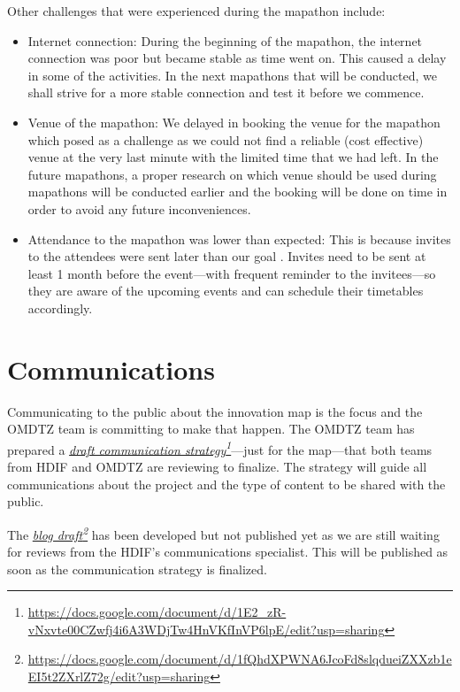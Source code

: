 \documentclass[a4paper,12pt,twoside]{article}
\begin{document}
Other challenges that were experienced during the mapathon include:
\begin{itemize}
	\item {\color{OMDTZblue}Internet connection:} During the beginning of the mapathon, the internet connection was poor but became stable as time went on. This caused a delay in some of the activities. In the next mapathons that will be conducted, we shall strive for a more stable connection and test it before we commence.
	
	\item {\color{OMDTZblue}Venue of the mapathon:} We delayed in booking the venue for the mapathon which posed as a challenge as we could not find a reliable (cost effective) venue at the very last minute with the limited time that we had left. In the future mapathons, a proper research on which venue should be used during mapathons will be conducted earlier and the booking will be done on time in order to avoid any future inconveniences.
	
	\item {\color{OMDTZblue}Attendance to the mapathon was lower than expected:} This is because invites to the attendees were sent later than our goal . Invites need to be sent at least 1 month before the event---with frequent reminder to the invitees---so they are aware of the upcoming events and can schedule their timetables accordingly.
\end{itemize}

\section{Communications}
Communicating to the public about the innovation map is the focus and the OMDTZ team is committing to make that happen. The OMDTZ team has prepared a \textit{\href{https://docs.google.com/document/d/1E2_zR-vNxvte00CZwfj4i6A3WDjTw4HnVKfInVP6lpE/edit?usp=sharing}{draft communication strategy}\footnote{\url{https://docs.google.com/document/d/1E2_zR-vNxvte00CZwfj4i6A3WDjTw4HnVKfInVP6lpE/edit?usp=sharing}}}---just for the map---that both teams from HDIF and OMDTZ are reviewing to finalize. The strategy will guide all communications about the project and the type of content to be shared with the public.

The \textit{\href{https://docs.google.com/document/d/1fQhdXPWNA6JcoFd8slqdueiZXXzb1eEI5t2ZXrlZ72g/edit?usp=sharing}{blog draft}\footnote{\url{https://docs.google.com/document/d/1fQhdXPWNA6JcoFd8slqdueiZXXzb1eEI5t2ZXrlZ72g/edit?usp=sharing}}} has been developed but not published yet as we are still waiting for reviews from the HDIF's communications specialist. This will be published as soon as the communication strategy is finalized.
\end{document}
